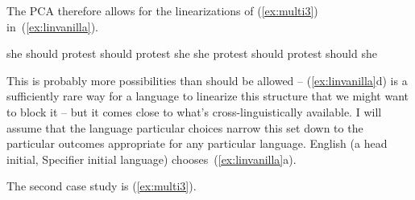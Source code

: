 \documentclass[output=paper]{langsci/langscibook}
\begin{document}
The \gls{PCA} therefore allows for the linearizations of (\ref{ex:multi3})
in~(\ref{ex:linvanilla}).
\begin{exe}
	\ex \label{ex:linvanilla}
	\begin{xlist}
		\ex she should protest
		\ex should protest she
		\ex she protest should
		\ex protest should she
	\end{xlist}
\end{exe}

This is probably more possibilities than should be allowed -- (\ref{ex:linvanilla}d) is a sufficiently rare way for a language to linearize this structure that we might want to block it -- but it comes close to what's cross-linguistically available. I will assume that the language particular choices narrow this set down to the particular outcomes appropriate for any particular language. English (a head initial, Specifier initial language) chooses~(\ref{ex:linvanilla}a).

The second case study is (\ref{ex:multi3}).

\begin{exe}
\end{exe}
\end{document}
